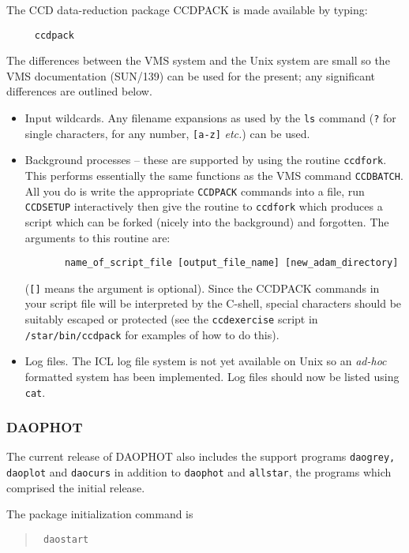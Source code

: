 The CCD data-reduction package CCDPACK is made available 
by typing:
\begin{verbatim}
     ccdpack
\end{verbatim}
The differences between
the VMS system and the Unix system are small so the VMS documentation
(SUN/139) can be used for the present; any significant differences are
outlined below.
\begin{itemize}
\item Input wildcards. Any filename expansions as
used by the {\tt ls} command ({\tt ?} for single characters, {\tt*} for any
number, {\tt[a-z]} {\sl etc.}) can be used.

\item Background processes -- these are supported by using the routine
{\tt ccdfork}. This performs essentially the same functions as
the VMS command {\tt CCDBATCH}. All you do is write
the appropriate {\tt CCDPACK} commands into a file, run {\tt CCDSETUP}
interactively then give the routine to {\tt ccdfork} which produces a
script which can be forked (nicely into the background) and
forgotten. The arguments to this routine are:
\begin{verbatim}
       name_of_script_file [output_file_name] [new_adam_directory]
\end{verbatim}
({\tt []} means the argument is optional).
Since the CCDPACK commands in your script file will be
interpreted by the C-shell, special characters should be
suitably escaped or protected (see the {\tt ccdexercise} script in
{\tt /star/bin/ccdpack} for examples of how to do this).

\item Log files. The ICL log file system is not yet available on Unix
so an {\sl ad-hoc\/} formatted system has been implemented. Log files
should now be listed using {\tt cat}.
\end{itemize}

\subsubsection{DAOPHOT}

The current release of DAOPHOT also includes the support programs {\tt daogrey,
daoplot} and {\tt daocurs} in addition to {\tt daophot} and {\tt allstar},
the programs which comprised the initial release.

The package initialization command is 
\begin{quote}\tt
daostart
\end{quote}

